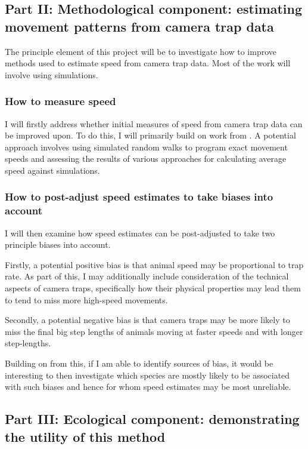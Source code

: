 \documentclass[11pt]{article}
\begin{document}
	
	\subsection{Part II: Methodological component: estimating movement patterns from camera trap data}
	
	The principle element of this project will be to investigate how to improve methods used to estimate speed from camera trap data. Most of the work will involve using simulations.
	
	\subsubsection{How to measure speed}
	
	I will firstly address whether initial measures of speed from camera trap data can be improved upon. To do this, I will primarily build on work from \cite{rowcliffe2016wildlife}. A potential approach involves using simulated random walks to program exact movement speeds and assessing the results of various approaches for calculating average speed against simulations.
	
	\subsubsection{How to post-adjust speed estimates to take biases into account}
	
	I will then examine how speed estimates can be post-adjusted to take two principle biases into account.
	
	Firstly, a potential positive bias is that animal speed may be proportional to trap rate. As part of this, I may additionally include consideration of the technical aspects of camera traps, specifically how their physical properties may lead them to tend to miss more high-speed movements.
	
	Secondly, a potential negative bias is that camera traps may be more likely to miss the final big step lengths of animals moving at faster speeds and with longer step-lengths. 
	
	Building on from this, if I am able to identify sources of bias, it would be interesting to then investigate which species are mostly likely to be associated with such biases and hence for whom speed estimates may be most unreliable.
	
	\subsection{Part III: Ecological component: demonstrating the utility of this method}
	
\end{document}
